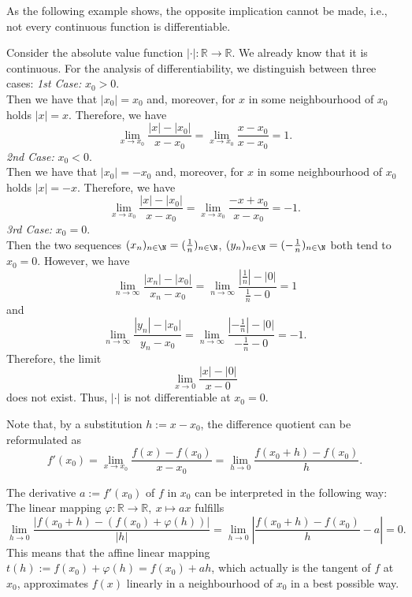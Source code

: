 As the following example shows, the opposite implication cannot be made, i.e., not every continuous function is differentiable.

\begin{example}
    Consider the absolute value function $|\cdot|:\mathbb{R}\to\mathbb{R}$. We already know that it is continuous. For the analysis of differentiability, we distinguish between three cases:
{\em 1st Case:} $x_0>0$.\\
Then we have that $|x_0|=x_0$ and, moreover, for $x$ in some neighbourhood of $x_0$ holds $|x|=x$. Therefore, we have
\[\lim_{x\to x_0}\frac{|x|-|x_0|}{x-x_0}=\lim_{x\to x_0}\frac{x-x_0}{x-x_0}=1.\]
{\em 2nd Case:} $x_0<0$.\\
Then we have that $|x_0|=-x_0$ and, moreover, for $x$ in some neighbourhood of $x_0$ holds $|x|=-x$. Therefore, we have
\[\lim_{x\to x_0}\frac{|x|-|x_0|}{x-x_0}=\lim_{x\to x_0}\frac{-x+x_0}{x-x_0}=-1.\]
{\em 3rd Case:} $x_0=0$.\\
Then the two sequences $(x_n)_{n\in\N}=(\frac1n)_{n\in\N}$, $(y_n)_{n\in\N}=(-\frac1n)_{n\in\N}$ both tend to $x_0=0$. However, we have
\[\lim_{n\to \infty}\frac{|x_n|-|x_0|}{x_n-x_0}=
\lim_{n\to \infty}\frac{|\frac1n|-|0|}{\frac1n-0}=1\]
and
\[\lim_{n\to \infty}\frac{|y_n|-|x_0|}{y_n-x_0}=
\lim_{n\to \infty}\frac{|-\frac1n|-|0|}{-\frac1n-0}=-1.\]
Therefore, the limit
\[\lim_{x\to 0}\frac{|x|-|0|}{x-0}\]
does not exist. Thus, $|\cdot|$ is not differentiable at $x_0=0$.
\end{example}

Note that, by a substitution $h:=x-x_0$, the difference quotient can be reformulated as
\[f'(x_0)=\lim_{x\to x_0}\frac{f(x)-f(x_0)}{x-x_0}=\lim_{h\to 0}\frac{f(x_0+h)-f(x_0)}{h}.\]

The derivative $a:=f'(x_0)$ of $f$ in $x_0$ can be interpreted in the following way:
The linear mapping $\varphi:\mathbb{R}\rightarrow\mathbb{R},\ x\mapsto ax$ fulfills
$$\lim_{h\rightarrow 0}\frac{|f(x_0 + h)-(f(x_0)+\varphi(h))|}{|h|}=\lim_{h\rightarrow 0}\left|\frac{f(x_0+h)-f(x_0)}{h} - a \right| = 0.$$
This means that the affine linear mapping $t(h):=f(x_0)+\varphi(h)=f(x_0)+ah$, which actually is the tangent of $f$ at $x_0$,
approximates $f(x)$ linearly in a neighbourhood of $x_0$ in a best possible way. 

